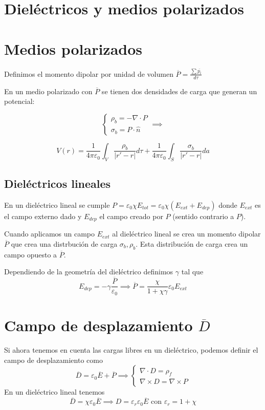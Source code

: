 \documentclass[leqno]{article}
\begin{document}
\section{Dieléctricos y medios polarizados}
\section{Medios polarizados}
Definimos el momento dipolar por unidad de volumen $\boxed{\overline{P} = \frac{\sum \overline{p_i}}{d\tau}}$

En un medio polarizado con $\overline{P}$ se tienen dos densidades de carga que generan un potencial:

\begin{minipage}{0.4\textwidth}
\[
\begin{cases}
  \rho _b = -\nabla\cdot P\\
  \sigma _b = P\cdot \hat{n}
\end{cases}
\implies
\] 
\end{minipage}
\begin{minipage}{0.6\textwidth}
\[
V(r)=\frac{1}{4\pi\varepsilon _0}\int_V \frac{\rho _b}{ |r'-r|}d\tau + \frac{1}{4\pi\varepsilon _0}\int_S \frac{\sigma _b}{|r'-r|}da
\] 
\end{minipage}

\subsection{Dieléctricos lineales}
En un dieléctrico lineal se cumple $P = \varepsilon_0 \chi E_{tot} = \varepsilon _0\chi (E_{ext}+E_{dep})$ donde $E_{ext}$ es el campo externo dado y $E_{dep}$ el campo creado por $P$ (sentido contrario a $P$).

Cuando aplicamos un campo $E_{ext}$ al dieléctrico lineal se crea un momento dipolar $\overline{P}$ que crea una distrbución de carga $\sigma _b, \rho _b$. Esta distribución de carga crea un campo opuesto a $\overline{P}$.

Dependiendo de la geometría del dieléctrico definimos $\gamma$ tal que 
\[
E_{dep} = -\gamma \frac{\overline{P}}{\varepsilon _0} \implies \boxed{\overline{P}=\frac{\chi }{1+\chi \gamma}\varepsilon _0E_{ext}}
\] 

\section{Campo de desplazamiento $\overline{D}$}
Si ahora tenemos en cuenta las cargas libres en un dieléctrico, podemos definir el campo de desplazamiento como
\[
\boxed{\overline{D} = \varepsilon _0 \overline{E} + \overline{P}} \implies \begin{cases}
  \nabla\cdot D = \rho _f \\
  \nabla\times D = \nabla\times P
\end{cases}
\] 
En un dieléctrico lineal tenemos
\[
\overline{D} = \chi \varepsilon _0 \overline{E} \implies \boxed{D = \varepsilon _r\varepsilon _0\overline{E}} \text{ con } \varepsilon _r = 1+\chi 
\] 
\end{document}
